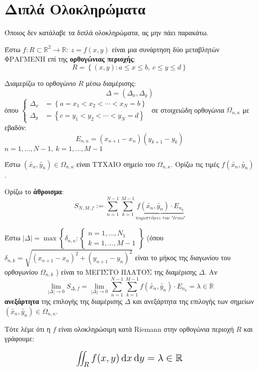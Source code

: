 \documentclass[11pt,a4paper,titlepage,draft]{article}
\begin{document}
\section{Διπλά Ολοκληρώματα}
\begin{attnbox}{}
Όποιος δεν κατάλαβε τα διπλά ολοκληρώματα, ας μην πάει παρακάτω.
\end{attnbox}

Έστω \(f: R \subset  \mathbb R ^2 \to  \mathbb R: \ z = f(x,y)\) είναι μια συνάρτηση δύο μεταβλητών ΦΡΑΓΜΕΝΗ επί της \textbf{ορθογώνιας περιοχής}:
\[R =  \left\lbrace (x,y): a \leq x \leq b, \ c \leq y \leq d  \right\rbrace\]


\begin{enumparen}
\item
Διαμερίζω το ορθογώνιο \(R\) μέσω διαμέρισης: \[
\Delta = \left( \Delta_x, \Delta_y \right)
\]
όπου \(
\begin{cases}
\Delta_x &=  \left\lbrace a=x_1<x_2< \cdots < x_N = b  \right\rbrace \\
\Delta_y &=   \left\lbrace c=y_1 < y_2 < \cdots < y_N = d  \right\rbrace
\end{cases}
\) σε στοιχειώδη ορθογώνια \(\Omega_{n,\kappa}\) με εβαδόν:
\[ Ε_{n,\kappa } = \left( x_{n+1} - x_n \right) \left( y_{k+1} - y_k \right) \]
\(n=1,\dots,N-1,\ k=1,\dots,M-1\)

\item
Έστω \((\tilde{x_n}, \tilde{y_n}) \in \Omega_{n,\kappa} \) είναι ΤΥΧΑΙΟ σημείο του \(\Omega_{n,\kappa}\). Ορίζω τις τιμές \(f(\widetilde{x_n}, \widetilde{y_n})\).

\item
Ορίζω το \textbf{άθροισμα}:
\[
S_{N,M,f} := 
\sum_{n=1}^{N-1} \sum_{k=1}^{M-1} \underbrace{f(\widetilde{x_n}, \widetilde{y_n}) \cdot E_{n_k}}_{\text{παριστάνει τον "όγκο"}}
 \]
 
\item
Έστω \(|\Delta| = \max  \left\lbrace \delta_{n, \kappa}:
\begin{cases}
n=1,\dots,N_1\\
k=1,\dots,M-1
\end{cases}
  \right\rbrace\)
(όπου 
\(\delta_{n,k}= \sqrt{ \left(x_{n+1} - x_n \right) ^2 +  \left(y_{n+1} - y_n \right) ^2 }\)
είναι το μήκος της διαγωνίου του ορθογωνίου \(\Omega_{n,k}\) ) είναι το ΜΕΓΙΣΤΟ ΠΛΑΤΟΣ της διαμέρισης \(\Delta\). Αν
\[
\lim_{|\Delta | \to 0} S_{\Delta, f} = 
\lim_{|\Delta | \to 0} \sum_{n=1}^{N-1} \sum_{k=1}^{M-1} f(\tilde{x_n}, \tilde{y_n}) \cdot E_{n_k}
= \lambda \in  \mathbb R 
\]
\textbf{ανεξάρτητα} της επιλογής της διαμέρισης \(\Delta\) και ανεξάρτητα της επιλογής των σημείων \( ( \widetilde{x_n},\widetilde{y_n}) \in \Omega_{n, \kappa } \). 

Τότε λέμε ότι η \(f\) είναι ολοκληρώσιμη κατά \textlatin{Riemann} στην ορθογώνια περιοχή \(R\) και γράφουμε:

\[
\mathlarger{\mathlarger{
 \iint_R f(x,y) \dif x \dif y = \lambda \in \mathbb R 
}} 
 \]
\end{enumparen}
\end{document}
